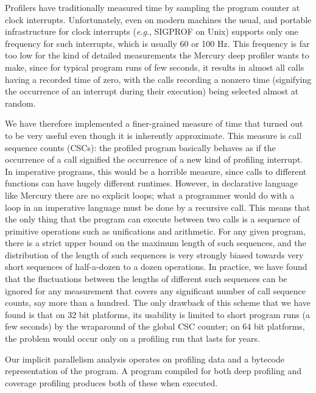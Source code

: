 Profilers have traditionally measured time
by sampling the program counter at clock interrupts.
Unfortunately, even on modern machines
the usual, and portable infrastructure for clock interrupts
(\emph{e.g}., SIGPROF on Unix)
supports only one frequency for such interrupts,
which is usually 60 or 100 Hz.
This frequency is far too low for the kind of detailed measurements
the Mercury deep profiler wants to make,
since for typical program runs of few seconds,
it results in almost all calls having a recorded time of zero,
with the calls recording a nonzero time
(signifying the occurrence of an interrupt during their execution)
being selected almost at random.

We have therefore implemented a finer-grained measure of time
that turned out to be very useful
even though it is inherently approximate.
This measure is call sequence counts (CSCs):
the profiled program basically behaves
as if the occurrence of a call signified
the occurrence of a new kind of profiling interrupt.
In imperative programs, this would be a horrible measure,
since calls to different functions can have hugely different runtimes.
However, in declarative language like Mercury there are no explicit loops;
what a programmer would do with a loop in an imperative language
must be done by a recursive call.
This means that the only thing that the program can execute between two calls
is a sequence of primitive operations such as unifications and arithmetic.
For any given program,
there is a strict upper bound on the maximum length of such sequences,
and the distribution of the length of such sequences
is very strongly biased towards very short sequences
of half-a-dozen to a dozen operations.
In practice, we have found that
the fluctuations between the lengths of different such sequences
can be ignored for any measurement
that covers any significant number of call sequence counts,
say more than a hundred.
The only drawback of this scheme that we have found
is that on 32 bit platforms,
its usability is limited to short program runs (a few seconds)
by the wraparound of the global CSC counter;
on 64 bit platforms, the problem would occur
only on a profiling run that lasts for years.



Our implicit parallelism analysis operates on profiling data and a
bytecode representation of the program.
A program compiled for both deep profiling and coverage profiling
produces both of these when executed.

